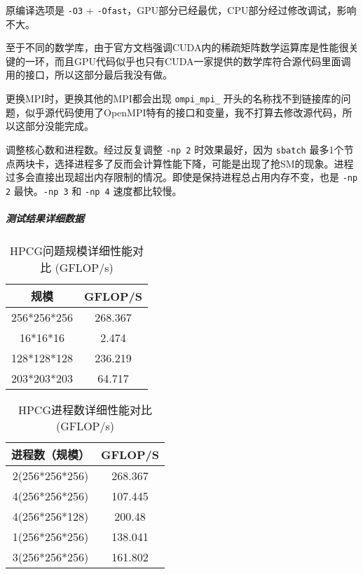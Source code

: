 \documentclass[a4paper,12pt,scheme=plain]{ctexart}
\newcommand{\inlinecode}[1]{\colorbox{gray!10}{\lstinline|#1|}}
\numberwithin{equation}{section} %
\begin{document}
原编译选项是 \inlinecode{-O3} + \inlinecode{-Ofast}，GPU部分已经最优，CPU部分经过修改调试，影响不大。

至于不同的数学库，由于官方文档强调CUDA内的稀疏矩阵数学运算库是性能很关键的一环，而且GPU代码似乎也只有CUDA一家提供的数学库符合源代码里面调用的接口，所以这部分最后我没有做。

更换MPI时，更换其他的MPI都会出现 \inlinecode{ompi_mpi_} 开头的名称找不到链接库的问题，似乎源代码使用了OpenMPI特有的接口和变量，我不打算去修改源代码，所以这部分没能完成。

调整核心数和进程数。经过反复调整 \inlinecode{-np 2} 时效果最好，因为 \inlinecode{sbatch} 最多1个节点两块卡，选择进程多了反而会计算性能下降，可能是出现了抢SM的现象。进程过多会直接出现超出内存限制的情况。即使是保持进程总占用内存不变，也是 \inlinecode{-np 2} 最快。\inlinecode{-np 3} 和 \inlinecode{-np 4} 速度都比较慢。

\subparagraph{测试结果详细数据}

\begin{table}[h]
    \renewcommand{\arraystretch}{1.5}
    \centering
    \caption{HPCG问题规模详细性能对比 (GFLOP/s)}
    \begin{tabular}{|c|c|}
    \hline
    \textbf{规模} & \textbf{GFLOP/S} \\
    \hline
    256*256*256 & 268.367 \\
    \hline
    16*16*16 & 2.474 \\
    \hline
    128*128*128 & 236.219 \\
    \hline
    203*203*203 & 64.717 \\
    \hline
    \end{tabular}
\end{table}

\begin{table}[h]
    \renewcommand{\arraystretch}{1.5}
    \centering
    \caption{HPCG进程数详细性能对比 (GFLOP/s)}
    \begin{tabular}{|c|c|}
    \hline
    \textbf{进程数（规模）} & \textbf{GFLOP/S} \\
    \hline
    2(256*256*256) & 268.367 \\
    \hline
    4(256*256*256) & 107.445 \\
    \hline
    4(256*256*128) & 200.48 \\
    \hline
    1(256*256*256) & 138.041 \\
    \hline
    3(256*256*256) & 161.802 \\
    \hline
    \end{tabular}
\end{table}
\end{document}
